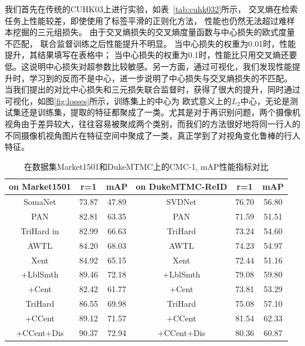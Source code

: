 我们首先在传统的CUHK03上进行实验，如表~\ref{tab:cuhk032}所示，
交叉熵在检索任务上性能较差，即使使用了标签平滑的正则化方法，
性能也仍然无法超过难样本挖掘的三元组损失。
由于交叉熵损失的交叉熵度量函数与中心损失的欧式度量不匹配，
联合监督训练之后性能提升不明显。
当中心损失的权重为0.01时，性能提升，其结果填写在表格中；
当中心损失的权重为0.1时，性能比只用交叉熵还要低。这说明中心损失对超参数比较敏感。另一方面，通过可视化，我们发现性能提升时，学习到的反而不是中心，进一步说明了中心损失与交叉熵损失的不匹配。 
当我们提出的对比中心损失和三元损失联合监督时，获得了很大的提升，同时通过可视化，如图\ref{fig:losses}所示，训练集上的中心为
欧式意义上的$L_2$中心，无论是测试集还是训练集，提取的特征都聚成了一类。尤其是对于再识别问题，两个摄像机视角由于差异较大，往往容易被聚成两个类别，而我们的方法很好地将同一行人的不同摄像机视角图片在特征空间中聚成了一类，真正学到了对视角变化鲁棒的行人特征。

\begin{table}
	\centering
	\caption{在数据集Market1501和DukeMTMC上的CMC-1, mAP性能指标对比}
	\label{tab:market2}
	\begin{tabular}{c|cc||c|cc}
		\hline
		on Market1501                          & r=1   & mAP   & on DukeMTMC-ReID & r=1   & mAP   \\ \hline 
		SomaNet \cite{zheng2017ped}            & 73.87 & 47.89 & SVDNet           & 76.70 & 56.80 \\ 
		PAN \cite{barbosa2017looking}          & 82.81 & 63.35 & PAN              & 71.59 & 51.51 \\  
		TriHard in \cite{hermans2017defense}   & 82.99 & 66.63 & TriHard          & 73.24 & 54.60 \\ 
		AWTL        \cite{ristani2018features} & 84.20 & 68.03 & AWTL             & 74.23 & 54.97 \\ \hline  \hline 
		Xent                                   & 84.92 & 65.15 & Xent             & 72.44 & 51.16 \\ 
		+LblSmth                               & 89.46 & 72.18 & +LblSmth         & 79.08 & 59.80 \\ 
		+Cent                                  & 82.42 & 61.77 & +Cent            & 73.81 & 53.29 \\ 
		TriHard                                & 86.55 & 69.98 & TriHard          & 75.08 & 57.10 \\
		+CCent                                 & 89.12 & 71.57 & +CCent           & 81.54 & 62.33 \\
		+CCent+Dis                             & 90.37 & 72.94 & +CCent+Dis       & 80.36 & 60.87 \\  \hline 
	\end{tabular}
\end{table}


